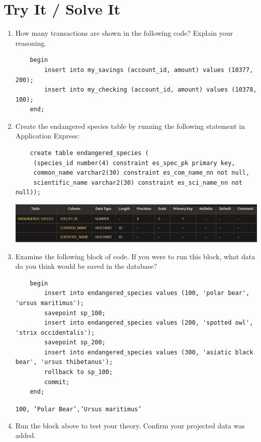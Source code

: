 \documentclass[11pt]{article}
\begin{document}
\section{Try It / Solve It}
\label{sec:orgc58bd9f}
\begin{enumerate}
\item How many transactions are shown in the following code? Explain your reasoning.
\begin{verbatim}
    begin
        insert into my_savings (account_id, amount) values (10377, 200);
        insert into my_checking (account_id, amount) values (10378, 100);
    end;
\end{verbatim}

\item Create the endangered species table by running the following statement in Application Express:
\begin{verbatim}
    create table endangered_species (
     (species_id number(4) constraint es_spec_pk primary key,
     common_name varchar2(30) constraint es_com_name_nn not null,
     scientific_name varchar2(30) constraint es_sci_name_nn not null));
\end{verbatim}

\begin{center}
\includegraphics[width=.9\linewidth]{./resources/2023-10-28_21-47.png}
\end{center}

\item Examine the following block of code. If you were to run this block, what data do you think would be saved in the database?
\begin{verbatim}
    begin
        insert into endangered_species values (100, 'polar bear', 'ursus maritimus');
        savepoint sp_100;
        insert into endangered_species values (200, 'spotted owl', 'strix occidentalis');
        savepoint sp_200;
        insert into endangered_species values (300, 'asiatic black bear', 'ursus thibetanus');
        rollback to sp_100;
        commit;
    end;
\end{verbatim}

\texttt{100, 'Polar Bear','Ursus maritimus'}

\item Run the block above to test your theory. Confirm your projected data was added.


\end{enumerate}
\end{document}
